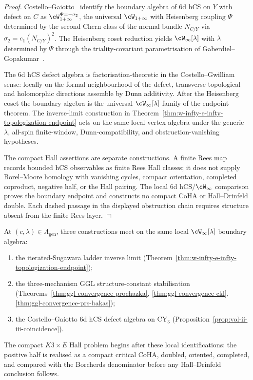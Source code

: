 \begin{proof}
Costello--Gaiotto~\cite{costello-gaiotto-6d-hCS} identify the
boundary algebra of $6$d hCS on $Y$ with defect on $C$ as
$\cW_{1+\infty}^{\Psi = -\sigma_2}$, the universal $\cW_{1+\infty}$
with Heisenberg coupling $\Psi$ determined by the second Chern
class of the normal bundle $N_{C/Y}$ via
$\sigma_2 = c_1(N_{C/Y})^2$. The Heisenberg coset reduction
yields $\cW_\infty[\lambda]$ with $\lambda$ determined by $\Psi$
through the triality-covariant parametrisation of
Gaberdiel--Gopakumar~\cite{GaberdielGopakumar2011-Winfty}.

The $6$d hCS defect algebra is factorisation-theoretic in the
Costello--Gwilliam sense: locally on the formal neighbourhood of
the defect, transverse topological and holomorphic directions
assemble by Dunn additivity. After the Heisenberg coset the
boundary algebra is the universal $\cW_\infty[\lambda]$ family of
the endpoint theorem. The inverse-limit construction in
Theorem~\ref{thm:w-infty-e-infty-topologization-endpoint} acts on
the same local vertex algebra under the generic-$\lambda$,
all-spin finite-window, Dunn-compatibility, and
obstruction-vanishing hypotheses.

The compact Hall assertions are separate constructions. A finite
Rees map records bounded hCS observables as finite Rees Hall
classes; it does not supply Borel--Moore homology with vanishing
cycles, compact orientation, completed coproduct, negative half,
or the Hall pairing. The local $6$d hCS/$\cW_\infty$ comparison
proves the boundary endpoint and constructs no compact CoHA or
Hall--Drinfeld double. Each dashed passage in the displayed
obstruction chain requires structure absent from the finite Rees
layer.
\end{proof}

\begin{remark}
\label{rem:three-way-consistency}
At $(c, \lambda) \in \Lambda_{\mathrm{gen}}$, three constructions
meet on the same local $\cW_\infty[\lambda]$ boundary algebra:
\begin{enumerate}[label=\textup{(\roman*)}]
\item the iterated-Sugawara ladder inverse limit
 \textup{(}Theorem~\ref{thm:w-infty-e-infty-topologization-endpoint}\textup{)};
\item the three-mechanism GGL structure-constant stabilisation
 \textup{(}Theorems~\ref{thm:ggl-convergence-prochazka},
 \ref{thm:ggl-convergence-ckl},
 \ref{thm:ggl-convergence-prs-bakas}\textup{)};
\item the Costello--Gaiotto $6$d hCS defect algebra on
 $\mathrm{CY}_3$
 \textup{(}Proposition~\ref{prop:vol-ii-iii-coincidence}\textup{)}.
\end{enumerate}
The compact $K3\times E$ Hall problem begins after these local
identifications: the positive half is realised as a compact
critical CoHA, doubled, oriented, completed, and compared with
the Borcherds denominator before any Hall--Drinfeld conclusion
follows.
\end{remark}

